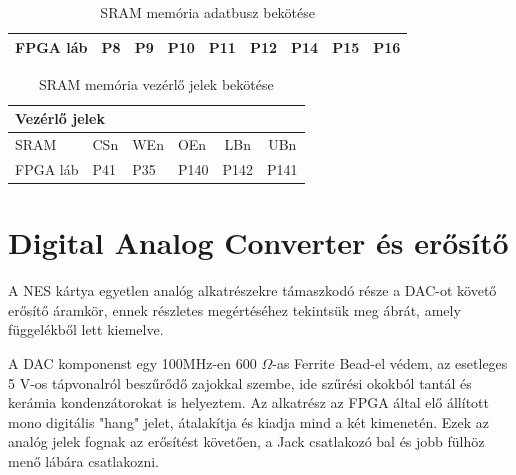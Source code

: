 \begin{table}[H]
\begin{tabular}{|lcccccccc|}
			\multicolumn{1}{|l|}{FPGA láb}                                                & \multicolumn{1}{c|}{P8}                                                 & \multicolumn{1}{c|}{P9}                                                 & \multicolumn{1}{c|}{P10}                                                & \multicolumn{1}{c|}{P11}                                                & \multicolumn{1}{c|}{P12}                                                & \multicolumn{1}{c|}{P14}                                                & \multicolumn{1}{c|}{P15}                                                & P16                        \\ \hline
		\end{tabular}
		\caption{SRAM memória adatbusz bekötése}
		\label{tab:FPGA-DATA-SRAMpin}
	\end{table}

	\begin{table}[H]
		\footnotesize
		\centering
		\begin{tabular}{|llllcc|}
			\hline
			\multicolumn{6}{|l|}{\cellcolor[HTML]{C0C0C0}\textbf{Vezérlő jelek}}                                                                                \\ \hline
			\multicolumn{1}{|l|}{SRAM}     & \multicolumn{1}{l|}{CSn} & \multicolumn{1}{l|}{WEn} & \multicolumn{1}{l|}{OEn}  & \multicolumn{1}{c|}{LBn}  & UBn  \\ \hline
			\multicolumn{1}{|l|}{FPGA láb} & \multicolumn{1}{l|}{P41} & \multicolumn{1}{l|}{P35} & \multicolumn{1}{l|}{P140} & \multicolumn{1}{c|}{P142} & P141 \\ \hline
		\end{tabular}
		\caption{SRAM memória vezérlő jelek bekötése}
		\label{tab:FPGA-CONTROL-SRAMpin}
	\end{table} 
	
\section{Digital Analog Converter és erősítő}
	
	A NES kártya egyetlen analóg alkatrészekre támaszkodó része a DAC-ot követő erősítő áramkör, ennek részletes megértéséhez tekintsük meg  ábrát, amely  függelékből lett kiemelve.
	
	A DAC komponenst egy 100MHz-en 600 $\Omega$-as Ferrite Bead-el védem, az esetleges 5 V-os tápvonalról beszűrődő zajokkal szembe, ide szűrési okokból tantál és kerámia kondenzátorokat is helyeztem. Az alkatrész az FPGA által elő állított mono digitális "hang" jelet, átalakítja és kiadja mind a két kimenetén. Ezek az analóg jelek fognak az erősítést követően, a Jack csatlakozó bal és jobb fülhöz menő lábára csatlakozni. 
	
